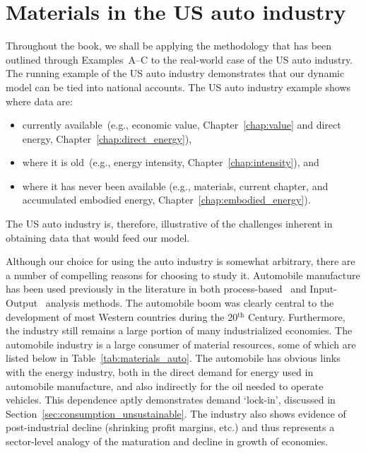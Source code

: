 \section{Materials in the US auto industry}
\label{sec:materials_auto}

Throughout the book, we shall be applying the methodology
that has been outlined through Examples~A--C to the
real-world case of the US auto industry.
The running example of the US auto industry demonstrates that our dynamic model 
can be tied into national accounts.
The US auto industry example shows where data are:
\begin{itemize}
	\item 	currently available~(e.g., economic value, Chapter~\ref{chap:value} and direct energy, Chapter~\ref{chap:direct_energy}), 
	\item	where it is old~(e.g., energy intensity, Chapter~\ref{chap:intensity}), and 
	\item	where it has never been available 
				(e.g., materials, current chapter, and accumulated embodied energy, Chapter~\ref{chap:embodied_energy}). 
\end{itemize} 
\noindent{}The US auto industry is, therefore, 
illustrative of the challenges inherent 
in obtaining data that would feed our model.

Although our choice for using the auto industry is somewhat arbitrary,
there are a number of compelling reasons for choosing to study it. 
Automobile manufacture has been used previously
in the literature in both 
process-based~\cite{Berry:1973vo, Sullivan1995, Stodolsky1995, 
							Sullivan1998, McCleese2002, Sullivan2010, Hawkins2012}
and Input-Output~\cite{Bullard:1978vd, MacLean1998, MacLean2003}
analysis methods.
The automobile boom was clearly central to 
the development of most Western countries 
during the 20$^\mathrm{th}$ Century.
Furthermore, the industry
still remains a large portion of many industrialized economies.
The automobile industry is a large consumer of material resources,
some of which are listed below in Table~\ref{tab:materials_auto}.
The automobile has obvious links with the energy industry, 
both in the direct demand for energy used in automobile manufacture,
and also indirectly for the oil needed to operate vehicles.
This dependence aptly demonstrates demand `lock-in', 
discussed in Section~\ref{sec:consumption_unsustainable}.
The industry also shows evidence of 
post-industrial decline (shrinking profit margins, etc.)
and thus represents a sector-level analogy of the maturation and 
decline in growth of economies.

